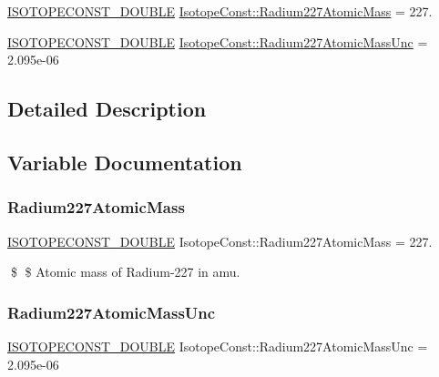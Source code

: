 \begin{DoxyCompactItemize}
\item 
\mbox{\hyperlink{group___isotope_const-_macros_ga8f45a7272ce02c0b4c65c44636ed719a}{I\+S\+O\+T\+O\+P\+E\+C\+O\+N\+S\+T\+\_\+\+D\+O\+U\+B\+LE}} \mbox{\hyperlink{group___isotope_const-_radium-_ra227_gaaad0fb839ba1be7779febfc0ac9fe3d0}{Isotope\+Const\+::\+Radium227\+Atomic\+Mass}} = 227.
\item 
\mbox{\hyperlink{group___isotope_const-_macros_ga8f45a7272ce02c0b4c65c44636ed719a}{I\+S\+O\+T\+O\+P\+E\+C\+O\+N\+S\+T\+\_\+\+D\+O\+U\+B\+LE}} \mbox{\hyperlink{group___isotope_const-_radium-_ra227_ga9f722e2b054d12746db9c0ef6b44169b}{Isotope\+Const\+::\+Radium227\+Atomic\+Mass\+Unc}} = 2.\+095e-\/06
\end{DoxyCompactItemize}


\subsection{Detailed Description}


\subsection{Variable Documentation}
\mbox{\label{group___isotope_const-_radium-_ra227_gaaad0fb839ba1be7779febfc0ac9fe3d0}} 
\subsubsection{\texorpdfstring{Radium227\+Atomic\+Mass}{Radium227AtomicMass}}
{\footnotesize\ttfamily \mbox{\hyperlink{group___isotope_const-_macros_ga8f45a7272ce02c0b4c65c44636ed719a}{I\+S\+O\+T\+O\+P\+E\+C\+O\+N\+S\+T\+\_\+\+D\+O\+U\+B\+LE}} Isotope\+Const\+::\+Radium227\+Atomic\+Mass = 227.}

\$ \$ Atomic mass of Radium-\/227 in amu. \mbox{\label{group___isotope_const-_radium-_ra227_ga9f722e2b054d12746db9c0ef6b44169b}} 
\subsubsection{\texorpdfstring{Radium227\+Atomic\+Mass\+Unc}{Radium227AtomicMassUnc}}
{\footnotesize\ttfamily \mbox{\hyperlink{group___isotope_const-_macros_ga8f45a7272ce02c0b4c65c44636ed719a}{I\+S\+O\+T\+O\+P\+E\+C\+O\+N\+S\+T\+\_\+\+D\+O\+U\+B\+LE}} Isotope\+Const\+::\+Radium227\+Atomic\+Mass\+Unc = 2.\+095e-\/06}


